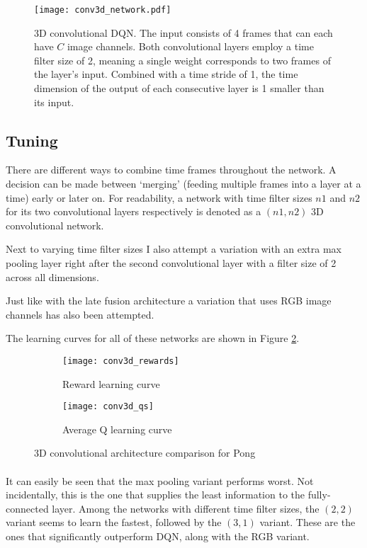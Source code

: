\begin{figure}[htpb]
  \centering
  \texttt{[image: conv3d\_network.pdf]}
  \caption[3D Conv DQN]{
    3D convolutional DQN.
    The input consists of 4 frames
    that can each have $C$ image channels.
    Both convolutional layers employ a time filter size of 2,
    meaning a single weight corresponds to
    two frames of the layer's input.
    Combined with a time stride of 1,
    the time dimension of the output of each consecutive layer
    is 1 smaller than its input.
  }
  \label{fig:conv3d_network}
\end{figure}

\subsection{Tuning}
\label{sub:conv3d_tuning}
There are different ways to combine time frames throughout the network.
A decision can be made between `merging'
(feeding multiple frames into a layer at a time)
early or later on.
For readability,
a network with time filter sizes
$n1$ and $n2$ for its two convolutional layers respectively
is denoted as a $(n1, n2)$ 3D convolutional network.

Next to varying time filter sizes
I also attempt a variation with an extra max pooling layer
right after the second convolutional layer
with a filter size of 2 across all dimensions.

Just like with the late fusion architecture
a variation that uses RGB image channels has also been attempted.

The learning curves for all of these networks
are shown in Figure \ref{fig:conv3d_both}.

\begin{figure}[htpb]
  \centering
  \begin{subfigure}[t]{.49\linewidth}
    \caption{Reward learning curve}
    \texttt{[image: conv3d\_rewards]}
  \end{subfigure}
  \begin{subfigure}[t]{.49\linewidth}
    \caption{Average Q learning curve}
    \texttt{[image: conv3d\_qs]}
  \end{subfigure}
  \caption[3D Conv DQN comparison]{
    3D convolutional architecture comparison for Pong
  }
  \label{fig:conv3d_both}
\end{figure}

\paragraph{}
It can easily be seen that the max pooling variant
performs worst.
Not incidentally,
this is the one that supplies the least information
to the fully-connected layer.
Among the networks with different time filter sizes,
the $(2,2)$ variant seems to learn the fastest,
followed by the $(3,1)$ variant.
These are the ones that significantly outperform DQN,
along with the RGB variant.


